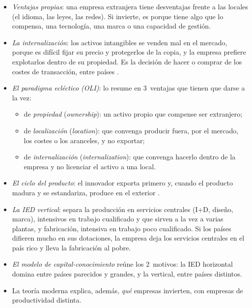 \documentclass[11pt]{article}
\begin{document}
\begin{itemize}
\item \emph{Ventajas propias}: una empresa extranjera tiene desventajas frente a las locales (el idioma, las leyes, las redes). Si invierte, es porque tiene algo que lo compensa, una tecnología, una marca o una capacidad de gestión\nocite{Hymer1976International}.
\item \emph{La internalización}: los activos intangibles se venden mal en el mercado, porque es difícil fijar su precio y protegerlos de la copia, y la empresa prefiere explotarlos dentro de su propiedad\nocite{BuckleyCasson1976Future}. Es la decisión de hacer o comprar de los costes de transacción, entre países .
\item \emph{El paradigma ecléctico (OLI)}: \textcites{Dunning1977Trade}{Dunning1980Eclectic} lo resume en 3~ventajas que tienen que darse a la vez:
  \begin{itemize}
  \item de \emph{propiedad} (\emph{ownership}): un activo propio que compense ser extranjero;
  \item de \emph{localización} (\emph{location}): que convenga producir fuera, por el mercado, los costes o los aranceles, y no exportar;
  \item de \emph{internalización} (\emph{internalization}): que convenga hacerlo dentro de la empresa y no licenciar el activo a una local.
  \end{itemize}
\item \emph{El ciclo del producto}: el innovador exporta primero y, cuando el producto madura y se estandariza, produce en el exterior\nocite{Vernon1966International} .
\item \emph{La IED vertical}: \textcite{Helpman1984Simple} separa la producción en servicios centrales (I+D, diseño, marca), intensivos en trabajo cualificado y que sirven a la vez a varias plantas, y fabricación, intensiva en trabajo poco cualificado. Si los países difieren mucho en sus dotaciones, la empresa deja los servicios centrales en el país rico y lleva la fabricación al pobre.
\item \emph{El modelo de capital-conocimiento} reúne los 2~motivos: la IED horizontal domina entre países parecidos y grandes, y la vertical, entre países distintos\nocite{Markusen1984Multinationals,Carr2001Estimating}.
\item La teoría moderna explica, además, \emph{qué} empresas invierten, con empresas de productividad distinta.
\end{itemize}
\end{document}

